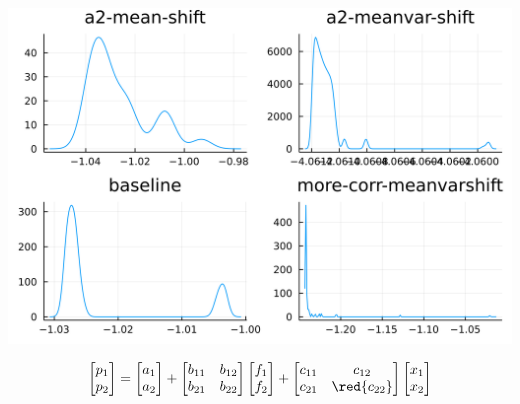 \documentclass[
  ignorenonframetext,
]{beamer}
\begin{document}
\begin{frame}{}
\protect\hypertarget{section-10}{}
\begin{center}\includegraphics[width=0.95\paperheight]{complexity_files/figure-beamer/unnamed-chunk-31-1} \end{center}

\[
\begin{bmatrix}
 p_1 \\ p_2
\end{bmatrix} =
\begin{bmatrix}
 a_1 \\ {a_2}
\end{bmatrix}
 + 
 \begin{bmatrix}
 {b_{11}} & b_{12} \\
 {b_{21}} & {b_{22}}
\end{bmatrix}
\begin{bmatrix}
 f_1 \\ f_2
\end{bmatrix}
+
 \begin{bmatrix}
 {c_{11}} & c_{12} \\
 c_{21} & \red{c_{22}}
\end{bmatrix} 
\begin{bmatrix}
 x_1 \\ x_2
\end{bmatrix}
\]
\end{frame}
\end{document}
